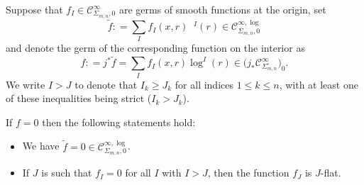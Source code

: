 \documentclass[JEP,XML,SOM,Unicode,NoFloatCountersInSection,published]{cedram}
\theoremstyle{definition}
\theoremstyle{remark}
\renewcommand{\le}{\leqslant}
\renewcommand{\ge}{\geqslant}
\newcommand{\ulog}{\mathop{\widetilde{\log}}\nolimits}
\newcommand{\uf}{\widetilde{f}}
\newcommand{\defas}{\mathrel{\mathop:}=}
\newcommand{\Cinf}[1]{\mathscr{C}^{\infty}_{#1}}
\newcommand{\Cinflog}[1]{\mathscr{C}^{\infty,\log}_{#1}}
\newcommand{\Sig}{\Sigma}
\newcommand{\intSig}{\Sigma^\circ}
\begin{document}
\begin{proposition}\label{prop:j^*-injective-induction}
Suppose that $f_{I} \in \Cinf{\Sig_{m,n},0}$ are germs of smooth functions at the origin, set
\[
\uf \defas \sum_{I} f_{I}(x,r)\ulog{}\!^I(r)
\in \Cinflog{\Sig_{m,n},0}
\]
and denote the germ of the corresponding function on the interior as
\[
f \defas j^*\uf = \sum_{I} f_{I}(x,r)\log^I(r)
\in \big(j_*\Cinf{\intSig_{m,n}}\big)_0
.
\]
We write $I>J$ to denote that $I_k\ge J_k$ for all indices $1\le k \le n$, with at least one of these inequalities being strict ($I_k > J_k$).

If $f=0$ then the following statements hold:
\begin{itemize}
\item[$(\alpha)$] We have $\uf = 0 \in \Cinflog{\Sig_{m,n},0}$.
\item[$(\beta)$] If $J$ is such that $f_I=0$ for all $I$ with $I>J$, then the function $f_{J}$ is $J$-flat.
\end{itemize}
\end{proposition}
\end{document}

